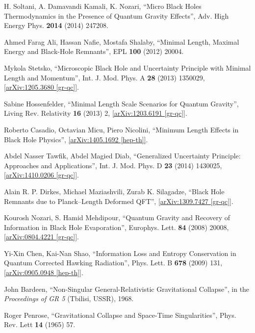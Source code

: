 \documentclass[12pt]{article}
\newcommand{\2}{$^2$}
\newcommand{\3}{$^3$}
\newcommand{\4}{$_4$}
\newcommand{\5}{$_5$}
\begin{document}
\begin{thebibliography}{400}
H. Soltani, A. Damavandi Kamali, K. Nozari, ``Micro Black Holes Thermodynamics in the Presence of Quantum Gravity Effects'', Adv. High Energy Phys. \textbf{2014} (2014) 247208.

Ahmed Farag Ali, Hassan Nafie, Mostafa Shalaby, ``Minimal Length, Maximal Energy and Black-Hole Remnants'', EPL \textbf{100} (2012) 20004. 

Mykola Stetsko, ``Microscopic Black Hole and Uncertainty Principle with Minimal Length and Momentum'', Int. J. Mod. Phys. A \textbf{28} (2013) 1350029, \href{http://arxiv.org/abs/1205.3680}{[arXiv:1205.3680 [gr-qc]]}.

Sabine Hossenfelder, ``Minimal Length Scale Scenarios for Quantum Gravity'', 	Living Rev. Relativity \textbf{16} (2013) 2, \href{http://arxiv.org/abs/1203.6191}{[arXiv:1203.6191 [gr-qc]]}. 

Roberto Casadio, Octavian Micu, Piero Nicolini, ``Minimum Length Effects in Black Hole Physics'', \href{http://arxiv.org/abs/1405.1692}{[arXiv:1405.1692 [hep-th]]}.

Abdel Nasser Tawfik, Abdel Magied Diab, ``Generalized Uncertainty Principle: Approaches and Applications'', Int. J. Mod. Phys. D \textbf{23} (2014) 1430025, \href{http://arxiv.org/abs/1410.0206}{[arXiv:1410.0206 [gr-qc]]}.

Alain R. P. Dirkes, Michael Maziashvili, Zurab K. Silagadze, ``Black Hole Remnants due to Planck--Length Deformed QFT'', \href{http://arxiv.org/abs/1309.7427}{[arXiv:1309.7427 [gr-qc]]}.

Kourosh Nozari, S. Hamid Mehdipour, ``Quantum Gravity and Recovery of Information in Black Hole Evaporation'', Europhys. Lett. \textbf{84} (2008) 20008, \href{http://arxiv.org/abs/0804.4221}{[arXiv:0804.4221 [gr-qc]]}.

Yi-Xin Chen, Kai-Nan Shao, ``Information Loss and Entropy Conservation in Quantum Corrected Hawking Radiation'', Phys. Lett. B \textbf{678} (2009) 131, \href{http://arxiv.org/abs/0905.0948}{[arXiv:0905.0948 [hep-th]]}.


John Bardeen, ``Non-Singular General-Relativistic Gravitational Collapse'',  in the \emph{Proceedings of GR 5} (Tbilisi, USSR), 1968.

Roger Penrose, ``Gravitational Collapse and Space-Time Singularities'', Phys. Rev. Lett \textbf{14} (1965) 57.


\end{thebibliography}
\end{document}
